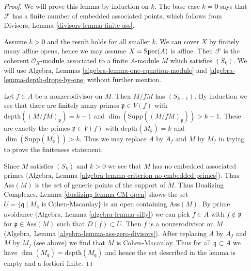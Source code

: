 \begin{proof}
We will prove this lemma by induction on $k$. The base case $k = 0$
says that $\mathcal{F}$ has a finite number of embedded associated points,
which follows from Divisors, Lemma \ref{divisors-lemma-finite-ass}.

\medskip\noindent
Assume $k > 0$ and the result holds for all smaller $k$.
We can cover $X$ by finitely many affine opens, hence we may
assume $X = \mathop{\mathrm{Spec}}(A)$ is affine. Then $\mathcal{F}$ is the
coherent $\mathcal{O}_X$-module associated to a finite $A$-module $M$
which satisfies $(S_k)$. We will use
Algebra, Lemmas \ref{algebra-lemma-one-equation-module} and
\ref{algebra-lemma-depth-drops-by-one}
without further mention.

\medskip\noindent
Let $f \in A$ be a nonzerodivisor on $M$. Then $M/fM$ has $(S_{k - 1})$.
By induction we see that there are finitely many
primes $\mathfrak p \in V(f)$ with
$\text{depth}((M/fM)_\mathfrak p) = k - 1$ and
$\dim(\text{Supp}((M/fM)_\mathfrak p)) > k - 1$.
These are exactly the primes $\mathfrak p \in V(f)$ with
$\text{depth}(M_\mathfrak p) = k$ and
$\dim(\text{Supp}(M_\mathfrak p)) > k$.
Thus we may replace $A$ by $A_f$ and $M$ by $M_f$
in trying to prove the finiteness statement.

\medskip\noindent
Since $M$ satisfies $(S_k)$ and $k > 0$ we see that $M$ has no
embedded associated primes
(Algebra, Lemma \ref{algebra-lemma-criterion-no-embedded-primes}).
Thus $\text{Ass}(M)$ is the set of generic points of the support
of $M$. Thus Dualizing Complexes, Lemma \ref{dualizing-lemma-CM-open}
shows the set
$U = \{\mathfrak q \mid M_\mathfrak q\text{ is Cohen-Macaulay}\}$
is an open containing $\text{Ass}(M)$.
By prime avoidance (Algebra, Lemma \ref{algebra-lemma-silly})
we can pick $f \in A$ with
$f \not \in \mathfrak p$ for $\mathfrak p \in \text{Ass}(M)$
such that $D(f) \subset U$.
Then $f$ is a nonzerodivisor on $M$
(Algebra, Lemma \ref{algebra-lemma-ass-zero-divisors}).
After replacing $A$ by $A_f$ and $M$ by $M_f$ (see above) we
find that $M$ is Cohen-Macaulay.
Thus for all $\mathfrak q \subset A$ we have
$\dim(M_\mathfrak q) = \text{depth}(M_\mathfrak q)$
and hence the set described in the lemma is empty
and a fortiori finite.
\end{proof}

